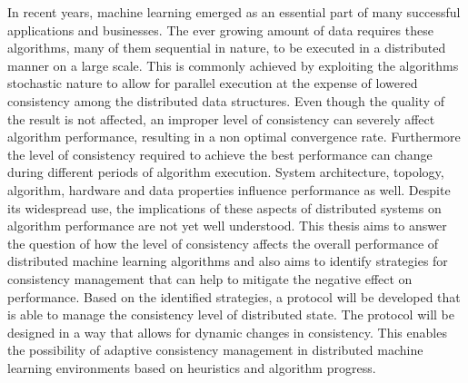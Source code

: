 % 
% 
%
In recent years, machine learning emerged as an essential part of many successful applications and businesses. The ever growing amount of data requires these algorithms, many of them sequential in nature, to be executed in a distributed manner on a large scale. This is commonly achieved by exploiting the algorithms stochastic nature to allow for parallel execution at the expense of lowered consistency among the distributed data structures. Even though the quality of the result is not affected, an improper level of consistency can severely affect algorithm performance, resulting in a non optimal convergence rate. Furthermore the level of consistency required to achieve the best performance can change during different periods of algorithm execution. System architecture, topology, algorithm, hardware and data properties influence performance as well. Despite its widespread use, the implications of these aspects of distributed systems on algorithm performance are not yet well understood. This thesis aims to answer the question of how the level of consistency affects the overall performance of distributed machine learning algorithms and also aims to identify strategies for consistency management that can help to mitigate the negative effect on performance. Based on the identified strategies, a protocol will be developed that is able to manage the consistency level of distributed state. The protocol will be designed in a way that allows for dynamic changes in consistency. This enables the possibility of adaptive consistency management in distributed machine learning environments based on heuristics and algorithm progress.
